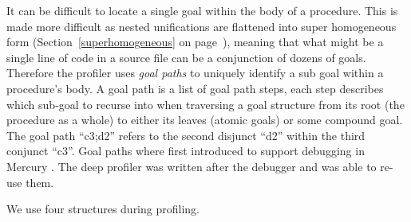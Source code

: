 
It can be difficult to locate a single goal within the body of a procedure.
This is made more difficult as nested unifications are flattened into super
homogeneous form
(Section~\ref{superhomogeneous} on page~\pageref{superhomogeneous}),
meaning that what might be a single line of code in a source file
can be a conjunction of dozens of goals.
Therefore the profiler uses \emph{goal paths} to uniquely identify a sub
goal within a procedure's body.
A goal path is a list of goal path steps, each step describes which
sub-goal to recurse into when traversing a goal structure from its
root (the procedure as a whole)
to either its leaves (atomic goals) or some compound goal.
The goal path ``c3;d2'' refers to the second disjunct ``d2'' within the
third conjunct ``c3''.
Goal paths where first introduced to support debugging in Mercury \citep{mdb}.
The deep profiler was written after the debugger and was able to re-use them.

We use four structures during profiling.

